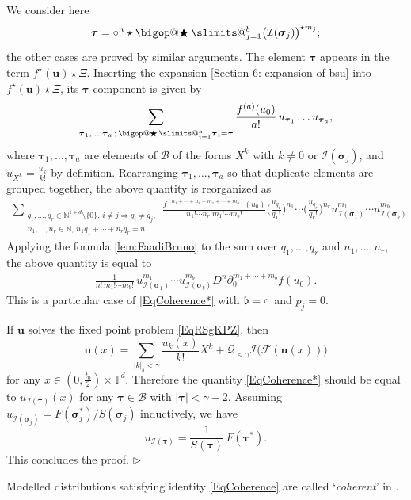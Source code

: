 \documentclass[10pt, reqno]{amsart}
\makeatletter
\numberwithin{subsection}{section}
\numberwithin{subsubsection}{subsection}
\numberwithin{equation}{section} %
\newenvironment{Dem}[1][\unskip]{%
    \begin{list}{\hspace{1.15cm}{\sf \textbf{{\small Proof #1 --}}}}{%
        \setlength{\topsep}{0pt}%
        \setlength{\leftmargin}{0pt}%
        \setlength{\rightmargin}{0pt}%
        \setlength{\listparindent}{0pt}%
        \setlength{\itemindent}{0pt}%
        \setlength{\parsep}{0pt}%
        \addtolength{\leftmargin}{0pt}%
        \addtolength{\rightmargin}{0pt}%
    } \item }{\hfill $\rhd$\end{list}\smallskip}
\theoremstyle{mystyle}
\theoremstyle{mystyle2}
\theoremstyle{mystyle3}
\DeclareRobustCommand\bigop[1]{%
  \mathop{\vphantom{\sum}\mathpalette\bigop@{#1}}\slimits@
}
\newcommand{\bigop@}[2]{%
  \vcenter{%
    \sbox\z@{$#1\sum$}%
    \hbox{\resizebox{\ifx#1\displaystyle.9\fi\dimexpr\ht\z@+\dp\z@}{!}{$\m@th#2$}}%
  }%
}
\newcommand{\Bigstar}{\DOTSB\bigop{\bigstar}}
\newcommand{\mcF}{\boldsymbol{p}}
\newcommand{\bsu}{\boldsymbol{u}}
\newcommand{\bstau}{\boldsymbol{\tau}}
\newcommand{\bssigma}{\boldsymbol{\sigma}}
\newcommand{\mfs}{\mathfrak{s}}
\newcommand{\ssk}{\smallskip}
\newcommand\bbN{\mathbb{N}}
\newcommand{\bbT}{\mathbb{T}}
\newcommand{\mcB}{\mathcal{B}}
\renewcommand{\mcF}{\mathcal{F}}
\newcommand{\mcI}{\mathcal{I}}
\newcommand{\mcQ}{\mathcal{Q}}
\makeatother
\begin{document}
\medskip

\begin{Dem}
We consider here
$$
\bstau = \circ^n\star\Bigstar_{j=1}^b \big(\mcI(\bssigma_j)\big)^{\star m_j};
$$
the other cases are proved by similar arguments. The element $\bstau$ appears in the term $f^\star(\bsu)\star \Xi$. Inserting the expansion \eqref{Section 6: expansion of bsu} into $f^\star(\bsu)\star \Xi$, its $\bstau$-component is given by
$$
\sum_{\bstau_1,\dots,\bstau_a\,;\, \Bigstar_{i=1}^a\bstau_i=\bstau}
\frac{f^{(a)}(u_0)}{a!} \, u_{\bstau_1}\dots u_{\bstau_a},
$$
where $\bstau_1,\dots,\bstau_a$ are elements of $\mcB$ of the forms $X^k$ with $k\neq0$ or $\mcI(\bssigma_j)$, and $u_{X^k}=\frac{u_k}{k!}$ by definition.
Rearranging $\bstau_1,\dots,\bstau_a$ so that duplicate elements are grouped together, the above quantity is reorganized as
\begin{align*}
\sum_{\substack{q_1,\dots,q_r\in\bbN^{1+d}\setminus\{0\},\,i\neq j\Rightarrow q_i\neq q_j, \\ 
n_1,\dots,n_r\in\bbN,\, n_1q_1+\cdots+n_rq_r=n}}
\frac{f^{(n_1+\cdots+n_r+m_1+\cdots+m_b)}(u_0)}{n_1!\cdots n_r!m_1!\cdots m_b!}
\Big(\frac{u_{q_1}}{q_1!}\Big)^{n_1}\cdots\Big(\frac{u_{q_r}}{q_r!}\Big)^{n_r}
u_{\mcI(\bssigma_1)}^{m_1}\cdots u_{\mcI(\bssigma_b)}^{m_b}
\end{align*}
Applying the formula \eqref{lem:FaadiBruno} to the sum over $q_1,\dots,q_r$ and $n_1,\dots,n_r$, the above quantity is equal to
\begin{align*}
\frac{1}{n!\,m_1!\cdots m_b!}\,
u_{\mcI(\bssigma_1)}^{m_1}\cdots u_{\mcI(\bssigma_b)}^{m_b}
D^n\partial_0^{m_1+\cdots+m_b}f(u_0).
\end{align*}
This is a particular case of \eqref{EqCoherence*} with $\frak{b}=\circ$ and $p_j=0$.

If $\bsu$ solves the fixed point problem \eqref{EqRSgKPZ}, then
$$
\bsu(x)=\sum_{|k|_\mfs<\gamma}\frac{u_k(x)}{k!}X^k+\mcQ_{<\gamma}\mcI\big(\mcF(\bsu(x))\big)
$$
for any $x\in(0,\frac{t_0}2)\times\bbT^d$. Therefore the quantity \eqref{EqCoherence*} should be equal to $u_{\mcI(\bstau)}(x)$ for any $\bstau\in\mcB$ with $|\bstau|<\gamma-2$. Assuming $u_{\mcI(\bssigma_j)}=F(\bssigma_j^*)/S(\bssigma_j)$ inductively, we have
$$
u_{\mcI(\bstau)}=\frac1{S(\bstau)}\,F(\bstau^*).
$$
This concludes the proof.
\end{Dem}

\ssk

Modelled distributions satisfying identity \eqref{EqCoherence} are called `\textit{coherent}' in \cite{BCCH18}.
\end{document}
